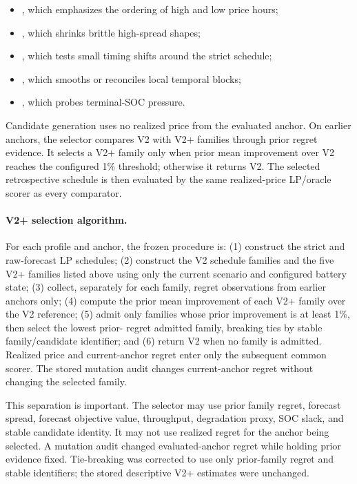 \begin{itemize}
\item {}, which emphasizes the ordering of high and low price hours;
\item {}, which shrinks brittle high-spread shapes;
\item {}, which tests small timing shifts around the strict schedule;
\item {}, which smooths or reconciles local temporal blocks;
\item {}, which probes terminal-SOC pressure.
\end{itemize}

Candidate generation uses no realized price from the evaluated anchor. On earlier anchors, the selector compares V2 with V2+ families through prior regret evidence. It selects a V2+ family only when prior mean improvement over V2 reaches the configured 1\% threshold; otherwise it returns V2. The selected retrospective schedule is then evaluated by the same realized-price LP/oracle scorer as every comparator.

\paragraph{V2+ selection algorithm.} For each profile and anchor, the frozen
procedure is: (1) construct the strict and raw-forecast LP schedules; (2)
construct the V2 schedule families and the five V2+ families listed above using
only the current scenario and configured battery state; (3) collect, separately
for each family, regret observations from earlier anchors only; (4) compute the
prior mean improvement of each V2+ family over the V2 reference; (5) admit only
families whose prior improvement is at least 1\%, then select the lowest prior-
regret admitted family, breaking ties by stable family/candidate identifier; and
(6) return V2 when no family is admitted. Realized price and current-anchor
regret enter only the subsequent common scorer. The stored mutation audit
changes current-anchor regret without changing the selected family.

This separation is important. The selector may use prior family regret, forecast spread, forecast objective value, throughput, degradation proxy, SOC slack, and stable candidate identity. It may not use realized regret for the anchor being selected. A mutation audit changed evaluated-anchor regret while holding prior evidence fixed. Tie-breaking was corrected to use only prior-family regret and stable identifiers; the stored descriptive V2+ estimates were unchanged.

